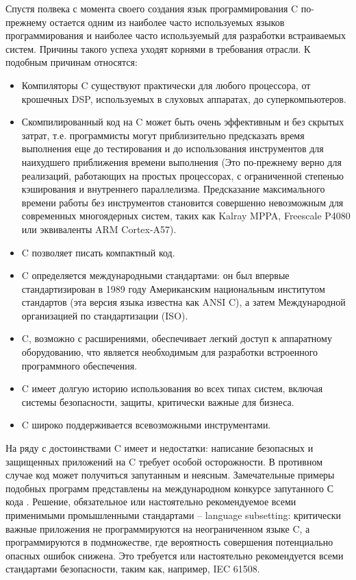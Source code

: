Спустя полвека с момента своего создания язык программирования C по-прежнему остается одним из наиболее часто 
используемых языков программирования\cite{TiobeIndex} и наиболее часто используемый для разработки 
встраиваемых систем. Причины такого успеха уходят корнями в требования отрасли. К подобным причинам относятся\cite{bagnara2018misra}:
\begin{itemize}
    \item Компиляторы C существуют практически для любого процессора, от крошечных DSP, используемых в слуховых аппаратах, до суперкомпьютеров.
    \item Скомпилированный код на C может быть очень эффективным и без скрытых затрат, т.е. программисты могут приблизительно предсказать время 
        выполнения еще до тестирования и до использования инструментов для наихудшего приближения времени выполнения (Это по-прежнему верно для 
        реализаций, работающих на простых процессорах, с ограниченной степенью кэширования и внутреннего параллелизма. Предсказание максимального 
        времени работы без инструментов становится совершенно невозможным для современных многоядерных систем, таких как Kalray MPPA, Freescale P4080 
        или эквиваленты ARM Cortex-A57).
    \item C позволяет писать компактный код.
    \item C определяется международными стандартами: он был впервые стандартизирован в 1989 году Американским национальным институтом стандартов (эта 
        версия языка известна как ANSI C), а затем Международной организацией по стандартизации (ISO).
    \item C, возможно с расширениями, обеспечивает легкий доступ к аппаратному оборудованию, что является необходимым для разработки встроенного 
        программного обеспечения.
    \item C имеет долгую историю использования во всех типах систем, включая системы безопасности, защиты, критически важные для бизнеса.
    \item C широко поддерживается всевозможными инструментами.
\end{itemize}

На ряду с достоинствами C имеет и недостатки: написание безопасных 
и защищенных приложений на C требует особой осторожности. В противном случае код может получиться 
запутанным и неясным. Замечательные примеры подобных программ представлены на международном конкурсе 
запутанного С кода \cite{ioccc}. Решение, обязательное или настоятельно рекомендуемое 
всеми применимыми промышленными стандартами -- language subsetting: критически важные приложения не 
программируются на неограниченном языке C, а программируются в подмножестве, где вероятность совершения 
потенциально опасных ошибок снижена. Это требуется или настоятельно рекомендуется всеми стандартами 
безопасности, таким как, например, IEC 61508\cite{IEC61508}.

